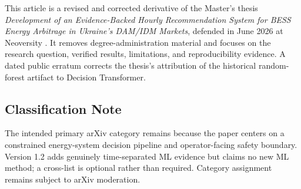 This article is a revised and corrected derivative of the Master's thesis \emph{Development of an Evidence-Backed Hourly Recommendation System for BESS Energy Arbitrage in Ukraine's DAM/IDM Markets}, defended in June 2026 at Neoversity \cite{fefelov2026thesis}. It removes degree-administration material and focuses on the research question, verified results, limitations, and reproducibility evidence. A dated public erratum corrects the thesis's attribution of the historical  random-forest artifact to Decision Transformer.

\subsection{Classification Note}

The intended primary arXiv category remains  because the paper centers on a constrained energy-system decision pipeline and operator-facing safety boundary. Version 1.2 adds genuinely time-separated ML evidence but claims no new ML method; a  cross-list is optional rather than required. Category assignment remains subject to arXiv moderation.
